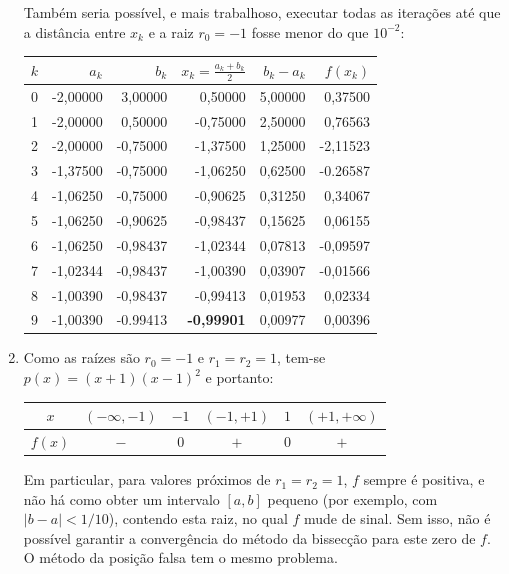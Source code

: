 \documentclass[12pt,a4paper]{article}
\begin{document}
\begin{ExerciseList}
\begin{enumerate}
Também seria possível, e mais trabalhoso, executar todas as iterações até que a distância entre $x_k$ e a raiz $r_0 = -1$ fosse menor do que $10^{-2}$:
\begin{center}
\begin{tabular}{|r|r|r|r|r|r|}
\hline
$k$ &  $a_k$ &  $b_k$ & $x_k = \frac{a_k+b_k}{2}$ & $b_k - a_k$ & $f(x_k)$ \\
\hline
0 & -2,00000 &  3,00000 &  0,50000 & 5,00000 &  0,37500 \\
\hline
1 & -2,00000 &  0,50000 & -0,75000 & 2,50000 &  0,76563 \\
\hline
2 & -2,00000 & -0,75000 & -1,37500 & 1,25000 & -2,11523 \\
\hline
3 & -1,37500 & -0,75000 & -1,06250 & 0,62500 & -0.26587 \\
\hline
4 & -1,06250 & -0,75000 & -0,90625 & 0,31250 &  0,34067 \\
\hline
5 & -1,06250 & -0,90625 & -0,98437 & 0,15625 &  0,06155 \\
\hline
6 & -1,06250 & -0,98437 & -1,02344 & 0,07813 & -0,09597 \\
\hline
7 & -1,02344 & -0,98437 & -1,00390 & 0,03907 & -0,01566 \\
\hline
8 & -1,00390 & -0,98437 & -0,99413 & 0,01953 &  0,02334 \\
\hline
9 & -1,00390 & -0.99413 & \textbf{-0,99901} & 0,00977 &  0,00396 \\
\hline
\end{tabular}
\end{center}

\item Como as raízes são $r_0 = -1$ e $r_1 = r_2 = 1$, tem-se $p(x) = (x+1)(x-1)^2$ e portanto:
\begin{center}
\begin{tabular}{|c|c|c|c|c|c|}
\hline
$x$ & $(-\infty, -1)$ & $-1$ & $(-1, +1)$ & $1$ & $(+1, +\infty)$ \\
\hline
$f(x)$ & $-$ & $0$ & $+$ & $0$ & $+$ \\
\hline
\end{tabular}
\end{center}
Em particular, para valores próximos de $r_1 = r_2 = 1$, $f$ sempre é positiva, e não há como obter um intervalo $[a,b]$ pequeno (por exemplo, com $|b - a| < 1/10$), contendo esta raiz, no qual $f$ mude de sinal. Sem isso, não é possível garantir a convergência do método da bissecção para este zero de $f$. O método da posição falsa tem o mesmo problema.
\end{enumerate}


\end{ExerciseList}
\end{document}
